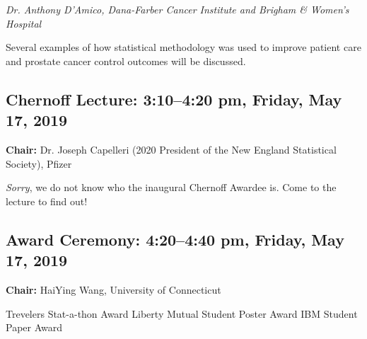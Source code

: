 \documentclass[10pt]{article}
\begin{document}
\emph{Dr. Anthony D'Amico, Dana-Farber Cancer Institute and Brigham \& Women's Hospital}

Several examples of how statistical methodology was used to improve
patient care and prostate cancer control outcomes will be discussed.


\subsection*{Chernoff Lecture: \hfill 3:10--4:20 pm, Friday, May 17, 2019}
{\bf Chair:}
Dr. Joseph Capelleri (2020 President of the New England
Statistical Society),  Pfizer

\emph{Sorry}, we do not know who the inaugural Chernoff Awardee is. Come to the
lecture to find out!

\subsection*{Award Ceremony: \hfill 4:20--4:40 pm, Friday, May 17, 2019}

{\bf Chair:} HaiYing Wang, University of Connecticut

Trevelers Stat-a-thon Award\hfill
Liberty Mutual Student Poster Award \hfill
IBM Student Paper Award

\clearpage



\clearpage

\twocolumn
\raggedright



\clearpage

\end{document}
